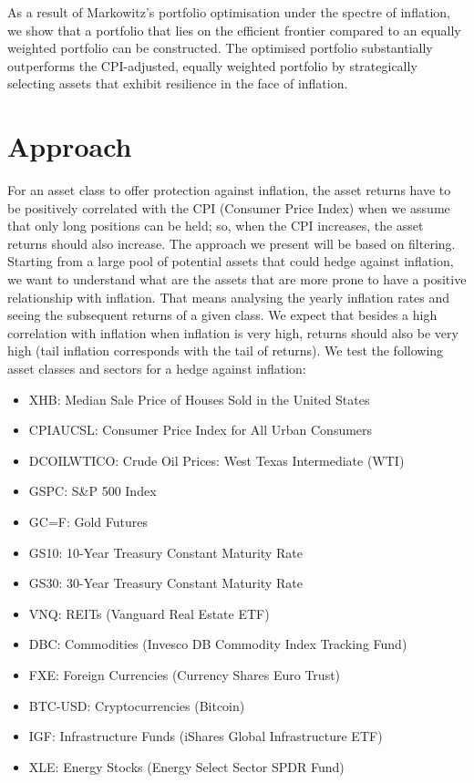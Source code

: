 \documentclass{article}
\begin{document}
As a result of Markowitz's portfolio optimisation under the spectre of inflation, we show that a portfolio that lies on the efficient frontier compared to an equally weighted portfolio can be constructed. The optimised portfolio substantially outperforms the CPI-adjusted, equally weighted portfolio by strategically selecting assets that exhibit resilience in the face of inflation.

\newpage

\section{Approach}

For an asset class to offer protection against inflation, the asset returns have to be positively correlated with the CPI (Consumer Price Index) when we assume that only long positions can be held; so, when the CPI increases, the asset returns should also increase. The approach we present will be based on filtering. Starting from a large pool of potential assets that could hedge against inflation, we want to understand what are the assets that are more prone to have a positive relationship with inflation. That means analysing the yearly inflation rates and seeing the subsequent returns of a given class. We expect that besides a high correlation with inflation when inflation is very high, returns should also be very high (tail inflation corresponds with the tail of returns). We test the following asset classes and sectors for a hedge against inflation:

\begin{itemize}
    \item XHB: Median Sale Price of Houses Sold in the United States
    \item CPIAUCSL: Consumer Price Index for All Urban Consumers
    \item DCOILWTICO: Crude Oil Prices: West Texas Intermediate (WTI)
    \item GSPC: S\&P 500 Index
    \item GC=F: Gold Futures
    \item GS10: 10-Year Treasury Constant Maturity Rate
    \item GS30: 30-Year Treasury Constant Maturity Rate
    \item VNQ: REITs (Vanguard Real Estate ETF)
    \item DBC: Commodities (Invesco DB Commodity Index Tracking Fund)
    \item FXE: Foreign Currencies (Currency Shares Euro Trust)
    \item BTC-USD: Cryptocurrencies (Bitcoin)
    \item IGF: Infrastructure Funds (iShares Global Infrastructure ETF)
    \item XLE: Energy Stocks (Energy Select Sector SPDR Fund)
\end{itemize}
\end{document}
